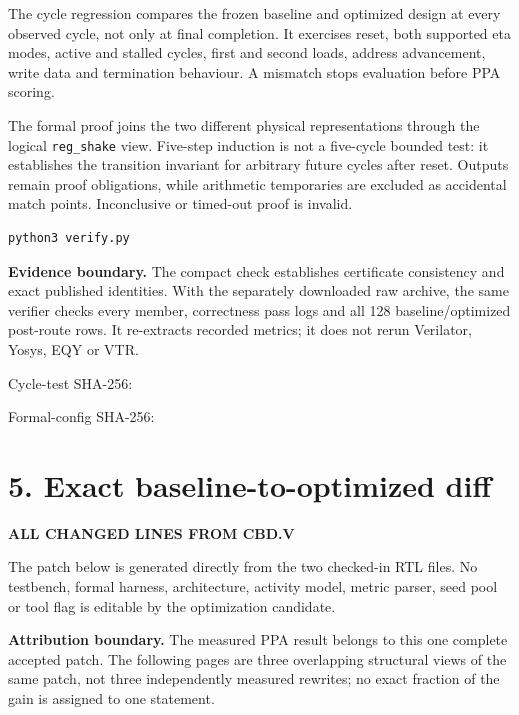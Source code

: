 \documentclass[10pt,a4paper]{article}
\newcommand{\hash}[1]{{\scriptsize\ttfamily\seqsplit{#1}}}
\newcommand{\smallcaps}[1]{\textcolor{Mid}{\fontsize{8.5}{10}\selectfont\bfseries\MakeUppercase{#1}}}
\newcommand{\newpageheading}[2]{\clearpage\section{#1}\smallcaps{#2}\vspace{6pt}}
\begin{document}
The cycle regression compares the frozen baseline and optimized design at every observed cycle, not only at final completion. It exercises reset, both supported eta modes, active and stalled cycles, first and second loads, address advancement, write data and termination behaviour. A mismatch stops evaluation before PPA scoring.

The formal proof joins the two different physical representations through the logical \texttt{reg\_shake} view. Five-step induction is not a five-cycle bounded test: it establishes the transition invariant for arbitrary future cycles after reset. Outputs remain proof obligations, while arithmetic temporaries are excluded as accidental match points. Inconclusive or timed-out proof is invalid.

\begin{lstlisting}
python3 verify.py
\end{lstlisting}

\begin{claimbox}
\textbf{Evidence boundary.} The compact check establishes certificate consistency and exact published identities. With the separately downloaded raw archive, the same verifier checks every member, correctness pass logs and all 128 baseline/optimized post-route rows. It re-extracts recorded metrics; it does not rerun Verilator, Yosys, EQY or VTR.
\end{claimbox}

Cycle-test SHA-256: \hash{\CycleTestHash}\par
Formal-config SHA-256: \hash{\FormalConfigHash}

\newpageheading{5. Exact baseline-to-optimized diff}{All changed lines from cbd.v}

The patch below is generated directly from the two checked-in RTL files. No testbench, formal harness, architecture, activity model, metric parser, seed pool or tool flag is editable by the optimization candidate.



\begin{scopebox}
\textbf{Attribution boundary.} The measured PPA result belongs to this one complete accepted patch. The following pages are three overlapping structural views of the same patch, not three independently measured rewrites; no exact fraction of the gain is assigned to one statement.
\end{scopebox}
\end{document}
